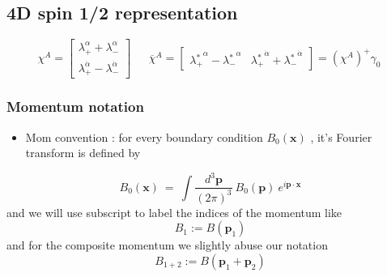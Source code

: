 \documentclass[11pt,a4paper]{article}
\begin{document}
\subsection{4D spin 1/2 representation}
\begin{equation}
\chi ^{A} =\begin{bmatrix}
\lambda _{+}^{\alpha } +\lambda _{-}^{\alpha }\\
\lambda _{+}^{\dot{\alpha }} -\lambda _{-}^{\dot{\alpha }}
\end{bmatrix} \ \ \ \ \ \ \ \overline{\chi }^{A} =\begin{bmatrix}
\lambda {_{+}^{*}}^{\alpha } -\lambda {_{-}^{*}}^{\alpha } & \lambda {_{+}^{*}}^{\dot{\alpha }} +\lambda {_{-}^{*}}^{\dot{\alpha }}
\end{bmatrix} =\left( \chi ^{A}\right)^{+} \gamma _{0} \ 
\end{equation}
\subsubsection{Momentum notation}

\begin{itemize}
\item Mom convention : for every boundary condition $\displaystyle B_{0}(\boldsymbol{x})$ , it's Fourier transform is defined by
\end{itemize}
\begin{equation}
B_{0}(\boldsymbol{x}) \ =\ \int \frac{d^{3}\boldsymbol{p}}{( 2\pi )^{3}} \ B_{0}(\boldsymbol{p}) \ e^{i\boldsymbol{p} \cdot \boldsymbol{x}}
\end{equation}
and we will use subscript to label the indices of the momentum like
\begin{equation}
    B_1 := B(\boldsymbol{p}_1)
\end{equation}
and for the composite momentum we slightly abuse our notation
\begin{equation}
    B_{1+2} := B(\boldsymbol{p}_{1}+\boldsymbol{p}_{2})
\end{equation}
\end{document}
